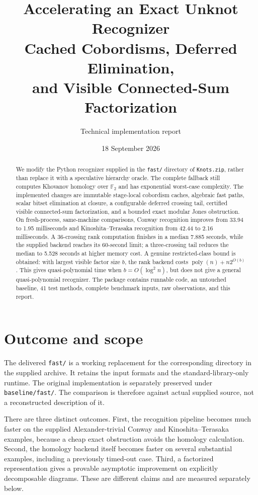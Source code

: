 \documentclass[11pt]{article}
\title{Accelerating an Exact Unknot Recognizer\\[0.35em]
\large Cached Cobordisms, Deferred Elimination,\\and Visible Connected-Sum Factorization}
\author{Technical implementation report}
\date{18 September 2026}
\theoremstyle{remark}\newtheorem{remark}[theorem]{Remark}
\newcommand{\F}{\mathbb F}
\newcommand{\poly}{\operatorname{poly}}
\begin{document}
\maketitle
\begin{abstract}
We modify the Python recognizer supplied in the \texttt{fast/} directory of
\texttt{Knots.zip}, rather than replace it with a speculative hierarchy oracle.
The complete fallback still computes Khovanov homology over $\F_2$ and has
exponential worst-case complexity. The implemented changes are immutable
stage-local cobordism caches, algebraic fast paths, scalar bitset elimination
at closure, a configurable deferred crossing tail, certified visible
connected-sum factorization, and a bounded exact modular Jones obstruction.
On fresh-process, same-machine comparisons, Conway recognition improves from
33.94 to 1.95 milliseconds and Kinoshita--Terasaka recognition from 42.44 to
2.16 milliseconds. A 36-crossing rank computation finishes in a median
7.885 seconds, while the supplied backend reaches its 60-second limit;
a three-crossing tail reduces the median to 5.528 seconds at higher memory cost.
A genuine restricted-class bound is obtained: with largest visible factor size
$b$, the rank backend costs $\poly(n)+n2^{O(b)}$. This gives quasi-polynomial
time when $b=O(\log^2 n)$, but does not give a general quasi-polynomial
recognizer. The package contains runnable code, an untouched baseline,
41 test methods, complete benchmark inputs, raw observations, and this report.
\end{abstract}
\clearpage
\setcounter{tocdepth}{2}
{\small\setlength{\parskip}{0pt}\tableofcontents}
\newpage

\section{Outcome and scope}
The delivered \texttt{fast/} is a working replacement for the corresponding
directory in the supplied archive. It retains the input formats and the
standard-library-only runtime. The original implementation is separately
preserved under \texttt{baseline/fast/}. The comparison is therefore against
actual supplied source, not a reconstructed description of it.

There are three distinct outcomes. First, the recognition pipeline becomes
much faster on the supplied Alexander-trivial Conway and
Kinoshita--Terasaka examples, because a cheap exact obstruction avoids the
homology calculation. Second, the homology backend itself becomes faster on
several substantial examples, including a previously timed-out case.
Third, a factorized representation gives a provable asymptotic improvement
on explicitly decomposable diagrams. These are different claims and are
measured separately below.
\end{document}

